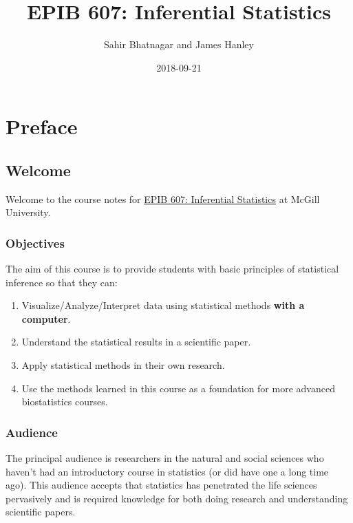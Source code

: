 \documentclass[]{book}
\title{EPIB 607: Inferential Statistics}
\author{Sahir Bhatnagar and James Hanley}
\date{2018-09-21}
\providecommand{\tightlist}{%
  \setlength{\itemsep}{0pt}\setlength{\parskip}{0pt}}
\providecommand{\tightlist}{%
  \setlength{\itemsep}{0pt}\setlength{\parskip}{0pt}}
\theoremstyle{definition}
\theoremstyle{definition}
\theoremstyle{definition}
\theoremstyle{remark}
\begin{document}
\maketitle

{
\setcounter{tocdepth}{1}
\tableofcontents
}
\part{Preface}\label{part-preface}

\chapter{Welcome}\label{welcome}

Welcome to the course notes for
\href{https://www.mcgill.ca/study/2018-2019/courses/epib-607}{EPIB 607:
Inferential Statistics} at McGill University.

\section{Objectives}\label{objectives}

The aim of this course is to provide students with basic principles of
statistical inference so that they can:

\begin{enumerate}
\def\labelenumi{\arabic{enumi}.}
\tightlist
\item
  Visualize/Analyze/Interpret data using statistical methods
  \textbf{with a computer}.
\item
  Understand the statistical results in a scientific paper.\\
\item
  Apply statistical methods in their own research.\\
\item
  Use the methods learned in this course as a foundation for more
  advanced biostatistics courses.
\end{enumerate}

\section{Audience}\label{audience}

The principal audience is researchers in the natural and social sciences
who haven't had an introductory course in statistics (or did have one a
long time ago). This audience accepts that statistics has penetrated the
life sciences pervasively and is required knowledge for both doing
research and understanding scientific papers.
\end{document}
